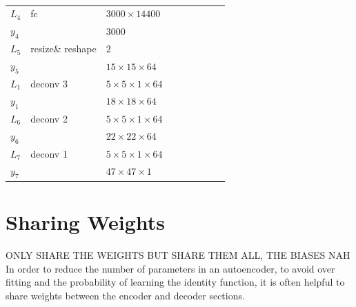 \begin{table}[h!]
{\begin{tabular}{|lllllllll|}
    \multicolumn{1}{|l|}{$L_4$}   & fc       & \multicolumn{1}{l|}{$3000\times 14400$}              &          & \multicolumn{1}{l|}{}        \\
    \multicolumn{1}{|l|}{$y_4$}   &          & \multicolumn{1}{l|}{$3000$}                         &          & \multicolumn{1}{l|}{}        \\ \hline

    \multicolumn{1}{|l|}{$L_5$}   & resize\& reshape & \multicolumn{1}{l|}{$2$}                    &          & \multicolumn{1}{l|}{}        \\
    \multicolumn{1}{|l|}{$y_5$}   &          & \multicolumn{1}{l|}{$15\times15\times 64$}          &          & \multicolumn{1}{l|}{}        \\ \hline

    \multicolumn{1}{|l|}{$L_1$}   & deconv 3   & \multicolumn{1}{l|}{$5\times 5\times1\times 64$}    &          & \multicolumn{1}{l|}{}\\
    \multicolumn{1}{|l|}{$y_1$}   &          & \multicolumn{1}{l|}{$18\times18\times64$}           &          & \multicolumn{1}{l|}{}        \\ \hline

    \multicolumn{1}{|l|}{$L_6$}   & deconv 2   & \multicolumn{1}{l|}{$5\times 5\times1\times 64$}    &          & \multicolumn{1}{l|}{}\\
    \multicolumn{1}{|l|}{$y_6$}   &          & \multicolumn{1}{l|}{$22\times22\times64$}           &          & \multicolumn{1}{l|}{}        \\ \hline


    \multicolumn{1}{|l|}{$L_7$}   & deconv 1   & \multicolumn{1}{l|}{$5\times 5\times1\times 64$}    &          & \multicolumn{1}{l|}{}\\
    \multicolumn{1}{|l|}{$y_7$}   &          & \multicolumn{1}{l|}{$47\times47\times1$}           &          & \multicolumn{1}{l|}{}        \\ \hline
    \end{tabular}
    \caption{} \label{net:2}
    }
    \end{table}
  \section{Sharing Weights}
    ONLY SHARE THE WEIGHTS BUT SHARE THEM ALL, THE BIASES NAH
    In order to reduce the number of parameters in an autoencoder, to avoid over fitting
    and the probability of learning the identity function, it is often helpful to share weights
    between the encoder and decoder sections.
